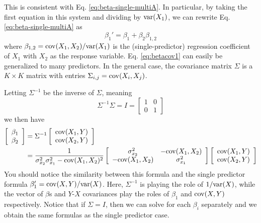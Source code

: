 This is consistent with Eq. \ref{eq:beta-single-multiA}. In particular, by taking the first equation in this system and dividing by ${\rm var}(X_1)$, we can rewrite Eq. \ref{eq:beta-single-multiA} as
\begin{equation}
\beta_1' = \beta_1  + \beta_2 \beta_{1,2}
\end{equation}
where $\beta_{1,2} = {\rm cov}(X_1,X_2)/{\rm var}(X_1)$ is the (single-predictor) regression coefficient of $X_1$ with $X_2$ as the response variable. Eq. \ref{eq:betacov1} can easily be generalized to many predictors. In the general case, the covariance matrix $\Sigma$ is a $K \times K$ matrix with entries $\Sigma_{i,j} = {\rm cov}(X_i,X_j)$. 

Letting $\Sigma^{-1}$ be the inverse of $\Sigma$, meaning 
\begin{equation}
\Sigma^{-1}\Sigma = I = \begin{bmatrix} 1 & 0 \\ 0 & 1 \end{bmatrix}
\end{equation}
we then have 
\begin{align*}
\left[\begin{array}{c}
\beta_1 \\
\beta_2 
\end{array}\right] &= \Sigma^{-1}\left[ \begin{array}{c}
 {\rm cov}(X_1,Y)\\
  {\rm cov}(X_2,Y)\\
  \end{array}\right]\\
  &=  \frac{1}{\sigma_{x_2}^2\sigma_{x_1}^2 -{\rm cov}(X_1,X_2)^2} \left[\begin{array}{cc}
\sigma_{x_2}^2 & -{\rm cov}(X_1,X_2)\\
- {\rm cov}(X_1,X_2) & \sigma_{x_1}^2
 \end{array} \right]\left[ \begin{array}{c}
 {\rm cov}(X_1,Y)\\
  {\rm cov}(X_2,Y)\\
  \end{array}\right]
\end{align*}
 You should notice the similarity between this formula and the single predictor formula $\beta_1' = {\rm cov}(X,Y)/{\rm var}(X)$. Here, $\Sigma^{-1}$ is playing the role of $1/{\rm var}(X)$, while the vector of $\beta$s and $Y$-$X$ covariances play the roles of $\beta_1$ and ${\rm cov}(X,Y)$ respectively. Notice that if $\Sigma = I$, then we can solve for each $\beta_i$ separately and we obtain the same formulas as the single predictor case. 
 
